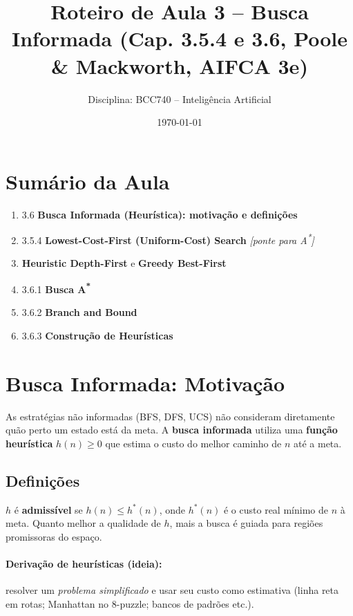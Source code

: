 \documentclass[9pt,a4paper]{extarticle}
\title{Roteiro de Aula 3 -- Busca Informada (Cap. 3.5.4 e 3.6, Poole \& Mackworth, AIFCA 3e)}
\author{Disciplina: BCC740 -- Inteligência Artificial}
\date{\today}
\newcommand{\Astar}{A\textsuperscript{*}}
\begin{document}
\maketitle

\section*{Sumário da Aula}
\begin{enumerate}
  \item 3.6 \textbf{Busca Informada (Heurística): motivação e definições}
  \item 3.5.4 \textbf{Lowest-Cost-First (Uniform-Cost) Search} \emph{[ponte para \Astar]}
  \item \textbf{Heuristic Depth-First} e \textbf{Greedy Best-First}
  \item 3.6.1 \textbf{Busca \Astar}
  \item 3.6.2 \textbf{Branch and Bound}
  \item 3.6.3 \textbf{Construção de Heurísticas}
\end{enumerate}

\section{Busca Informada: Motivação}

As estratégias não informadas (BFS, DFS, UCS) não consideram diretamente quão perto um estado está da meta.
A \textbf{busca informada} utiliza uma \textbf{função heurística} $h(n)\!\ge\!0$ que estima o custo do melhor caminho de $n$ até a meta.

\subsection*{Definições}
$h$ é \textbf{admissível} se $h(n)\le h^*(n)$, onde $h^*(n)$ é o custo real mínimo de $n$ à meta.
Quanto melhor a qualidade de $h$, mais a busca é guiada para regiões promissoras do espaço.

\paragraph{Derivação de heurísticas (ideia):} resolver um \emph{problema simplificado} e usar seu custo como estimativa (linha reta em rotas; Manhattan no 8-puzzle; bancos de padrões etc.).
\end{document}
